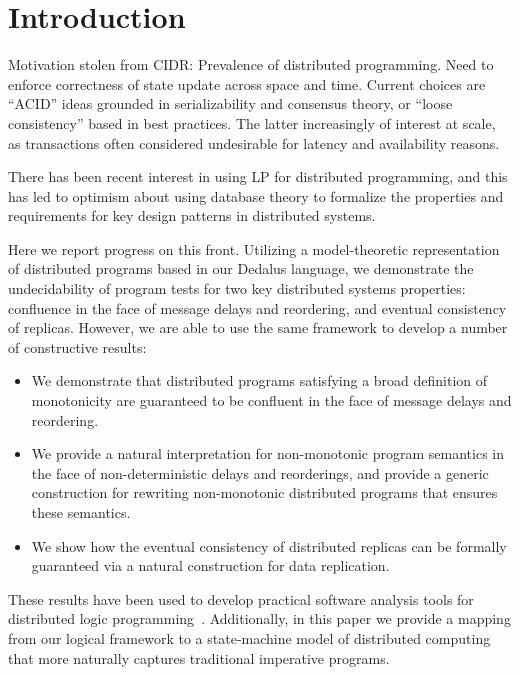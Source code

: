 \section{Introduction}
Motivation stolen from CIDR: Prevalence of distributed programming.  Need to enforce correctness of state update across space and time. Current choices are ``ACID'' ideas grounded in serializability and consensus theory, or ``loose consistency'' based in best practices.  The latter increasingly of interest at scale, as transactions often considered undesirable for latency and availability reasons.

There has been recent interest in using LP for distributed programming, and this has led to optimism about using database theory to formalize the properties and requirements for key design patterns in distributed systems.

Here we report progress on this front.  Utilizing a model-theoretic representation of distributed programs based in our Dedalus language, we demonstrate the undecidability of program tests for two key distributed systems properties: confluence in the face of message delays and reordering, and eventual consistency of replicas.  However, we are able to use the same framework to develop a number of constructive results:
\begin{itemize}
	\item We demonstrate that distributed programs satisfying a broad definition of  monotonicity are guaranteed to be confluent in the face of message delays and reordering.
	\item We provide a natural interpretation for non-monotonic program semantics in the face of non-deterministic delays and reorderings, and provide a generic construction for rewriting non-monotonic distributed programs that ensures these semantics.
	\item We show how the eventual consistency of distributed replicas can be formally guaranteed via a natural construction for data replication.
\end{itemize}

These results have been used to develop practical software analysis tools for distributed logic programming~\cite{cidr11}.  Additionally, in this paper we provide a mapping from our logical framework to a state-machine model of distributed computing that more naturally captures traditional imperative programs.
